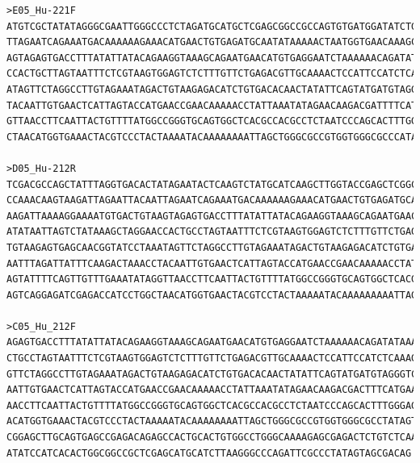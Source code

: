 \begin{verbatim}
>E05_Hu-221F
ATGTCGCTATATAGGGCGAATTGGGCCCTCTAGATGCATGCTCGAGCGGCCGCCAGTGTGATGGATATCTGCAGAATTCGCCCTTCAGTGAACGCCAAACAAGTAAGATTAGAATTACAA
TTAGAATCAGAAATGACAAAAAAGAAACATGAACTGTGAGATGCAATATAAAAACTAATGGTGAACAAAGCAAAGAATAAAAAATAAAAACGGAAAGATTAAAAGGAAAATGTGACTGTA
AGTAGAGTGACCTTTATATTATACAGAAGGTAAAGCAGAATGAACATGTGAGGAATCTAAAAAACAGATATAAAATAGAAACAACTGAAGGCTTATATAATTAGTCTATAAAGCTAGGAA
CCACTGCTTAGTAATTTCTCGTAAGTGGAGTCTCTTTGTTCTGAGACGTTGCAAAACTCCATTCCATCTCAAAGTTATTTTTAATGTTAAAATTTGTAAGAGTGAGCAACGGTATCCTAA
ATAGTTCTAGGCCTTGTAGAAATAGACTGTAAGAGACATCTGTGACACAACTATATTCAGTATGATGTAGGGTCTGTTACAATGGGATGAAGTGAATTTAGATTATTTCAAGACTAAACC
TACAATTGTGAACTCATTAGTACCATGAACCGAACAAAAACCTATTAAATATAGAACAAGACGATTTTCATGAAAAAATAAATATGAACAAATCAGTATTTTCAGTTGTTTGAAATATAG
GTTAACCTTCAATTACTGTTTTATGGCCGGGTGCAGTGGCTCACGCCACGCCTCTAATCCCAGCACTTTGGGAGGCCGAGGCACGCGGATCATGGGGTCAGGAGATCGAGACCATCCTGG
CTAACATGGTGAAACTACGTCCCTACTAAAATACAAAAAAAATTAGCTGGGCGCCGTGGTGGGCGCCCATAGTCCCAGC

>D05_Hu-212R
TCGACGCCAGCTATTTAGGTGACACTATAGAATACTCAAGTCTATGCATCAAGCTTGGTACCGAGCTCGGCTCCACTAGTAACGGCCGCCAGTGTGCTGGAATTCGCCCTTCAGTGAACG
CCAAACAAGTAAGATTAGAATTACAATTAGAATCAGAAATGACAAAAAAGAAACATGAACTGTGAGATGCAATATAAAAACTAATGGTGAACAAAGCAAAGAATAAAAAATAAAAACGGA
AAGATTAAAAGGAAAATGTGACTGTAAGTAGAGTGACCTTTATATTATACAGAAGGTAAAGCAGAATGAACATGTGAGGAATCTAAAAAACAGATATAAAATAGAAACAACTGAAGGCTT
ATATAATTAGTCTATAAAGCTAGGAACCACTGCCTAGTAATTTCTCGTAAGTGGAGTCTCTTTGTTCTGAGACGTTGCAAAACTCCATTCCATCTCAAAGTTATTTTTAATGTTAAAATT
TGTAAGAGTGAGCAACGGTATCCTAAATAGTTCTAGGCCTTGTAGAAATAGACTGTAAGAGACATCTGTGACACAACTATATTCAGTATGATGTAGGGTCTGTTACAATGGGATGAAGTG
AATTTAGATTATTTCAAGACTAAACCTACAATTGTGAACTCATTAGTACCATGAACCGAACAAAAACCTATTAAATATAGAACAAGACGACTTTCATGAAAAAATAAATATGAACAAATC
AGTATTTTCAGTTGTTTGAAATATAGGTTAACCTTCAATTACTGTTTTATGGCCGGGTGCAGTGGCTCACGCCACGCCTCTAATCCCAGCACTTTGGGAGGCCGAGGCAGGCGGATCATG
AGTCAGGAGATCGAGACCATCCTGGCTAACATGGTGAACTACGTCCTACTAAAAATACAAAAAAAAATTAGCTGGGCGCCGTGGTGGGCGCCTATAGTCCAGCTACTTTG

>C05_Hu_212F
AGAGTGACCTTTATATTATACAGAAGGTAAAGCAGAATGAACATGTGAGGAATCTAAAAAACAGATATAAAATAGAAACAACTGAAGGCTTATATAATTAGTCTATAAAGCTAGGAACCA
CTGCCTAGTAATTTCTCGTAAGTGGAGTCTCTTTGTTCTGAGACGTTGCAAAACTCCATTCCATCTCAAAGTTATTTTTAATGTTAAAATTTGTAAGAGTGAGCAACGGTATCCTAAATA
GTTCTAGGCCTTGTAGAAATAGACTGTAAGAGACATCTGTGACACAACTATATTCAGTATGATGTAGGGTCTGTTACAATGGGATGAAGTGAATTTAGATTATTTCAAGACTAAACCTAC
AATTGTGAACTCATTAGTACCATGAACCGAACAAAAACCTATTAAATATAGAACAAGACGACTTTCATGAAAAAATAAATATGAACAAATCAGTATTTTCAGTTGTTTGAAATATAGGTT
AACCTTCAATTACTGTTTTATGGCCGGGTGCAGTGGCTCACGCCACGCCTCTAATCCCAGCACTTTGGGAGGCCGAGGCAGGCGGATCATGAGGTCAGGAGATCGAGACCATCCTGGCTA
ACATGGTGAAACTACGTCCCTACTAAAAATACAAAAAAAATTAGCTGGGCGCCGTGGTGGGCGCCTATAGTCCCAGCTACTTGGGAGGCTGATGCAGAAGAATGGCATGAACCCGGGAGG
CGGAGCTTGCAGTGAGCCGAGACAGAGCCACTGCACTGTGGCCTGGGCAAAAGAGCGAGACTCTGTCTCAAAAAAAAAAAAAAGTACTAGTCGACGCGTGGCCAAGGGCGAATTCTGCAG
ATATCCATCACACTGGCGGCCGCTCGAGCATGCATCTTAAGGGCCCAGATTCGCCCTATAGTAGCGACAG


\end{verbatim}

